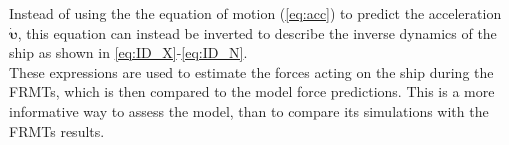 Instead of using the the equation of motion (\autoref{eq:acc}) to predict the acceleration $\pmb{\bm{\dot{\upsilon}}}$, this equation can instead be inverted to describe the inverse dynamics of the ship as shown in \autoref{eq:ID_X}-\autoref{eq:ID_N}.
\begin{equation}
    \label{eq:ID_X}
    
\end{equation}
\begin{equation}
    \label{eq:ID_Y}
    
\end{equation}
\begin{equation}
    \label{eq:ID_N}
    
\end{equation}
These expressions are used to estimate the forces acting on the ship during the FRMTs, which is then compared to the model force predictions. This is a more informative way to assess the model, than to compare its simulations with the FRMTs results.